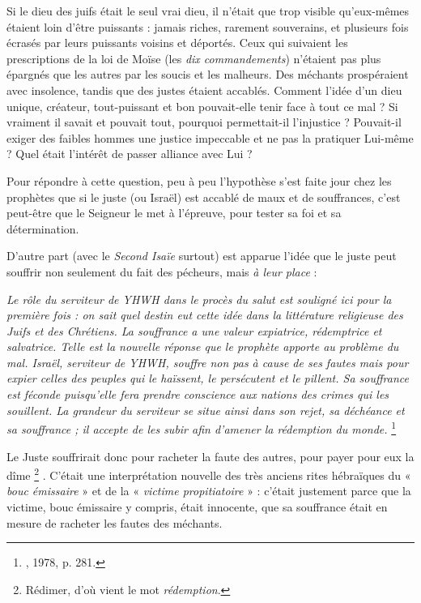  Si le dieu des juifs était le seul vrai dieu, il n'était que trop visible qu'eux-mêmes étaient loin d'être puissants : jamais riches, rarement souverains, et plusieurs fois écrasés par leurs puissants voisins et déportés. Ceux qui suivaient les prescriptions de la loi de Moïse (les \emph{dix commandements}) n'étaient pas plus épargnés que les autres par les soucis et les malheurs. Des méchants prospéraient avec insolence, tandis que des justes étaient accablés. Comment l'idée d'un dieu unique, créateur, tout-puissant et bon pouvait-elle tenir face à tout ce mal ? Si vraiment il savait et pouvait tout, pourquoi permettait-il l'injustice ? Pouvait-il exiger des faibles hommes une justice impeccable et ne pas la pratiquer Lui-même ? Quel était l'intérêt de passer alliance avec Lui ? 

 Pour répondre à cette question, peu à peu l'hypothèse s'est faite jour chez les prophètes que si le juste (ou Israël) est accablé de maux et de souffrances, c'est peut-être que le Seigneur le met à l'épreuve, pour tester sa foi et sa détermination. 

 D'autre part (avec le \emph{Second Isaïe} surtout) est apparue l'idée que le juste peut souffrir non seulement du fait des pécheurs, mais \emph{à leur place} :

\begin{displayquote}
{\emph{Le rôle du serviteur de YHWH dans le procès du salut est souligné ici pour la première fois : on sait quel destin eut cette idée dans la littérature religieuse des Juifs et des Chrétiens. La souffrance a une valeur expiatrice, rédemptrice et salvatrice. Telle est la nouvelle réponse que le prophète apporte au problème du mal. Israël, serviteur de YHWH, souffre non pas à cause de ses fautes mais pour expier celles des peuples qui le haïssent, le persécutent et le pillent. Sa souffrance est féconde puisqu'elle fera prendre conscience aux nations des crimes qui les souillent. La grandeur du serviteur se situe ainsi dans son rejet, sa déchéance et sa souffrance ; il accepte de les subir afin d'amener la rédemption du monde.}%
\footnote{, 1978, p. 281.}%
}
\end{displayquote}

Le Juste souffrirait donc pour racheter la faute des autres, pour payer pour eux la dîme%
\footnote{Rédimer, d'où vient le mot \emph{rédemption}.}%
. C'était une interprétation nouvelle des très anciens rites hébraïques du « \emph{bouc émissaire} » et de la « \emph{victime propitiatoire} » : c'était justement parce que la victime, bouc émissaire y compris, était innocente, que sa souffrance était en mesure de racheter les fautes des méchants. 

